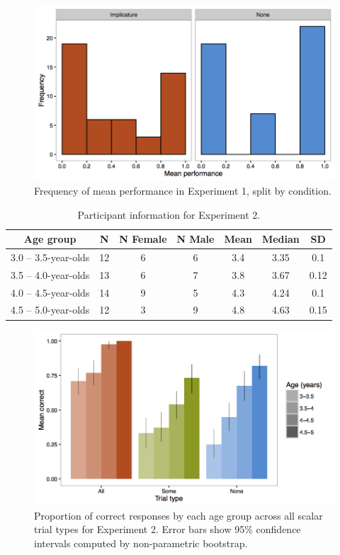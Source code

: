 \documentclass[man]{apa2}
\begin{document}
\begin{figure}
 \begin{center}
  \includegraphics[width=4.5in]{figures/exp1_hist.png}
  \caption{\label{fig:imp_hist} Frequency of mean performance in Experiment 1, split by condition.}
 \end{center}
\end{figure}

\begin{table}
\centering
\begin{tabular}{ccccccc}
\hline
{\bf Age group} & {\bf N} & {\bf N Female} & {\bf N Male} & {\bf Mean} & {\bf Median} & {\bf SD} \\
\hline
3.0 -- 3.5-year-olds & 12 & 6 & 6 & 3.4 & 3.35 & 0.1\\
3.5 -- 4.0-year-olds & 13 & 6 & 7 & 3.8 & 3.67 & 0.12\\
4.0 -- 4.5-year-olds & 14 & 9 & 5 & 4.3 & 4.24 & 0.1\\
4.5 -- 5.0-year-olds & 12 & 3 & 9 & 4.8 & 4.63 & 0.15\\
\hline
\end{tabular}
\caption{\label{tab:exp_2_demo}Participant information for Experiment 2.}
\end{table}

\begin{figure}
 \begin{center}
  \includegraphics[width=4.5in]{figures/exp2_performance.png}
  \caption{\label{fig:exp2_perf} Proportion of correct responses by each age group across all scalar trial types for Experiment 2. Error bars show 95\% confidence intervals computed by non-parametric bootstrap.}
 \end{center}
\end{figure}
\end{document}
